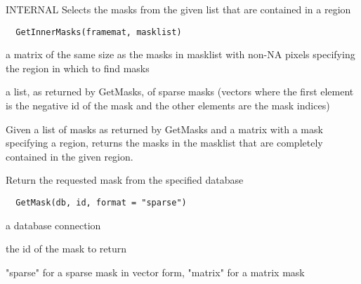 \documentclass[a4paper]{book}
\begin{document}
%
\begin{Description}\relax
INTERNAL Selects the masks from the given list that are
contained in a region
\end{Description}
%
\begin{Usage}
\begin{verbatim}
  GetInnerMasks(framemat, masklist)
\end{verbatim}
\end{Usage}
%
\begin{Arguments}
\begin{ldescription}
\item[\code{framemat}] a matrix of the same size as the masks in
masklist with non-NA pixels specifying the region in
which to find masks

\item[\code{masklist}] a list, as returned by GetMasks, of
sparse masks (vectors where the first element is the
negative id of the mask and the other elements are the
mask indices)
\end{ldescription}
\end{Arguments}
%
\begin{Details}\relax
Given a list of masks as returned by GetMasks and a
matrix with a mask specifying a region, returns the masks
in the masklist that are completely contained in the
given region.
\end{Details}
%
\begin{Description}\relax
Return the requested mask from the specified database
\end{Description}
%
\begin{Usage}
\begin{verbatim}
  GetMask(db, id, format = "sparse")
\end{verbatim}
\end{Usage}
%
\begin{Arguments}
\begin{ldescription}
\item[\code{db}] a database connection

\item[\code{id}] the id of the mask to return

\item[\code{format}] "sparse" for a sparse mask in vector form,
"matrix" for a matrix mask
\end{ldescription}
\end{Arguments}
\end{document}
